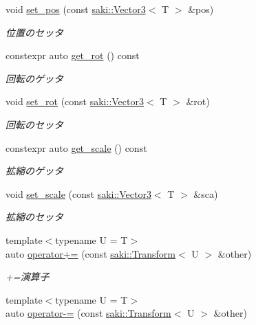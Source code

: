 \begin{DoxyCompactItemize}
void \mbox{\hyperlink{classsaki_1_1_transform_a95c42a0138889bfcb50504cc8c537e32}{set\+\_\+pos}} (const \mbox{\hyperlink{classsaki_1_1_vector3}{saki\+::\+Vector3}}$<$ T $>$ \&pos)
\begin{DoxyCompactList}\small\item\em 位置のセッタ \end{DoxyCompactList}\item 
constexpr auto \mbox{\hyperlink{classsaki_1_1_transform_a1b276b8bd5f894f1ed84b9e0c18b7bbf}{get\+\_\+rot}} () const
\begin{DoxyCompactList}\small\item\em 回転のゲッタ \end{DoxyCompactList}\item 
void \mbox{\hyperlink{classsaki_1_1_transform_a41ee7b20939707750c5a5e4b05985621}{set\+\_\+rot}} (const \mbox{\hyperlink{classsaki_1_1_vector3}{saki\+::\+Vector3}}$<$ T $>$ \&rot)
\begin{DoxyCompactList}\small\item\em 回転のセッタ \end{DoxyCompactList}\item 
constexpr auto \mbox{\hyperlink{classsaki_1_1_transform_a9bf1b1c0b061165e67013538bc2afdb2}{get\+\_\+scale}} () const
\begin{DoxyCompactList}\small\item\em 拡縮のゲッタ \end{DoxyCompactList}\item 
void \mbox{\hyperlink{classsaki_1_1_transform_a2dcad3e8995b8e0d03f5164cb450bac5}{set\+\_\+scale}} (const \mbox{\hyperlink{classsaki_1_1_vector3}{saki\+::\+Vector3}}$<$ T $>$ \&sca)
\begin{DoxyCompactList}\small\item\em 拡縮のセッタ \end{DoxyCompactList}\item 
{\footnotesize template$<$typename U  = T$>$ }\\auto \mbox{\hyperlink{classsaki_1_1_transform_a07df3fb4b31770e31777c7d54c15d3ea}{operator+=}} (const \mbox{\hyperlink{classsaki_1_1_transform}{saki\+::\+Transform}}$<$ U $>$ \&other)
\begin{DoxyCompactList}\small\item\em +=演算子 \end{DoxyCompactList}\item 
{\footnotesize template$<$typename U  = T$>$ }\\auto \mbox{\hyperlink{classsaki_1_1_transform_adb08907303d87e63755a01410ea6787e}{operator-\/=}} (const \mbox{\hyperlink{classsaki_1_1_transform}{saki\+::\+Transform}}$<$ U $>$ \&other)

\end{DoxyCompactItemize}
